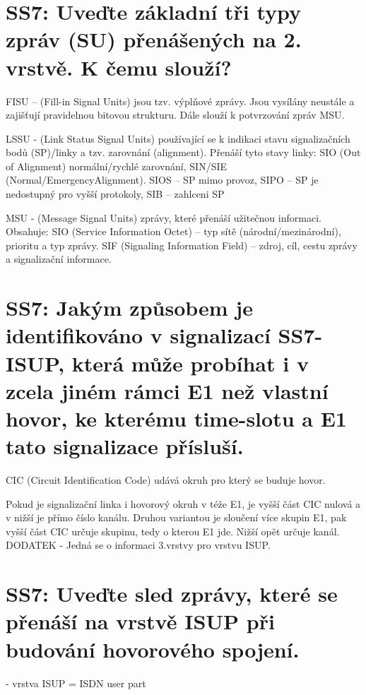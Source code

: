 \section{SS7: Uveďte základní tři typy zpráv (SU) přenášených na 2. vrstvě. K čemu slouží?}

FISU -- (Fill-in Signal Units) jsou tzv. výplňové zprávy. Jsou vysílány neustále a zajišťují pravidelnou bitovou strukturu. Dále slouží k potvrzování zpráv MSU.

LSSU - (Link Status Signal Units) používající se k indikaci stavu signalizačních bodů (SP)/linky a tzv. zarovnání (alignment). Přenáší tyto stavy linky: SIO (Out of Alignment) normální/rychlé zarovnání, SIN/SIE (Normal/EmergencyAlignment). SIOS -- SP mimo provoz, SIPO -- SP je nedostupný pro vyšší protokoly, SIB -- zahlceni SP

MSU - (Message Signal Units) zprávy, které přenáší užitečnou informaci. Obsahuje: SIO (Service Information Octet) -- typ sítě (národní/mezinárodní), prioritu a typ zprávy. SIF (Signaling Information Field) -- zdroj, cíl, cestu zprávy a signalizační informace.

\section{SS7: Jakým způsobem je identifikováno v signalizací SS7-ISUP, která může probíhat i v zcela jiném rámci E1 než vlastní hovor, ke kterému time-slotu a E1 tato signalizace přísluší.}

CIC (Circuit Identification Code) udává okruh pro který se buduje hovor.

Pokud je signalizační linka i hovorový okruh v téže E1, je vyšší část CIC nulová a v nižší je přímo číslo kanálu. Druhou variantou je sloučení více skupin E1, pak vyšší část CIC určuje skupinu, tedy o kterou E1 jde. Nižší opět určuje kanál. DODATEK - Jedná se o informaci 3.vrstvy pro vrstvu ISUP.

\section{SS7: Uveďte sled zprávy, které se přenáší na vrstvě ISUP při budování hovorového spojení.}

- vrstva ISUP = ISDN user part

